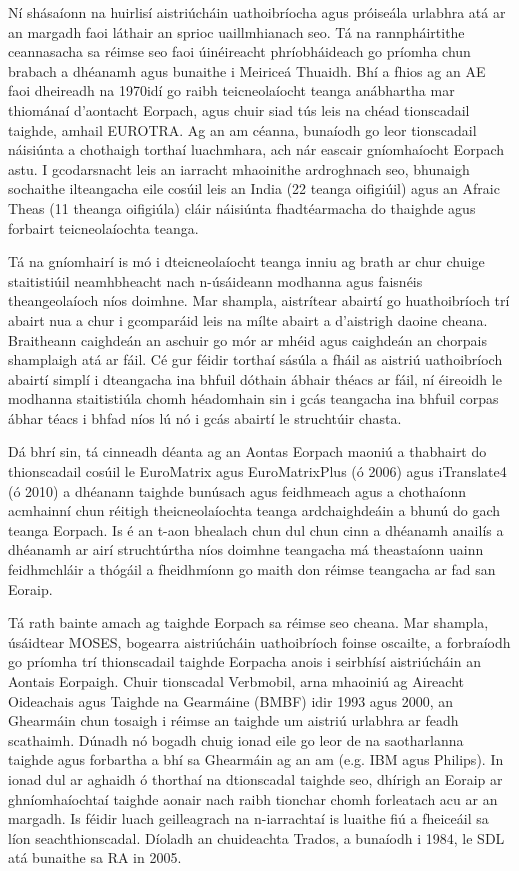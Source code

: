 \begin{multicols}{2}

Ní shásaíonn na huirlisí aistriúcháin uathoibríocha agus próiseála urlabhra atá ar an margadh faoi láthair an sprioc uaillmhianach seo. Tá na rannpháirtithe ceannasacha sa réimse seo faoi úinéireacht phríobháideach go príomha chun brabach a dhéanamh agus bunaithe i Meiriceá Thuaidh. Bhí a fhios ag an AE faoi dheireadh na 1970idí go raibh teicneolaíocht teanga an\-ábhartha mar thiománaí d’aontacht Eorpach, agus chuir siad tús leis na chéad tionscadail taighde, amhail EUROTRA. Ag an am céanna, bunaíodh go leor tionscadail náisiúnta a chothaigh torthaí luachmhara, ach nár eascair gníomhaíocht Eorpach astu. I gcodarsnacht leis an iarracht mhaoinithe ardroghnach seo, bhunaigh sochaithe ilteangacha eile cosúil leis an India (22 teanga oifigiúil) agus an Afraic Theas (11 theanga oifigiúla) cláir náisiúnta fhadtéarmacha do thaighde agus forbairt teicneolaíochta teanga. 

Tá na gníomhairí is mó i dteicneolaíocht teanga inniu ag brath ar chur chuige staitistiúil neamhbheacht nach n-úsáideann modhanna agus faisnéis theangeolaíoch níos doimhne. Mar shampla, aistrítear abairtí go huathoibríoch trí abairt nua a chur i gcomparáid leis na mílte abairt a d’aistrigh daoine cheana. Braitheann caighdeán an aschuir go mór ar mhéid agus caighdeán an chorpais shamplaigh atá ar fáil. Cé gur féidir torthaí sásúla a fháil as aistriú uathoibríoch abairtí simplí i dteangacha ina bhfuil dóthain ábhair théacs ar fáil, ní éireoidh le modhanna staitistiúla chomh héadomhain sin i gcás teangacha ina bhfuil corpas ábhar téacs i bhfad níos lú nó i gcás abairtí le struchtúir chasta.

Dá bhrí sin, tá cinneadh déanta ag an Aontas Eorpach maoniú a thabhairt do thionscadail cosúil le EuroMatrix agus EuroMatrixPlus (ó 2006) agus iTranslate4 (ó 2010) a dhéanann taighde bunúsach agus feidhmeach agus a chothaíonn acmhainní chun réitigh theicneolaíochta teanga ardchaighdeáin a bhunú do gach teanga Eorpach. Is é an t-aon bhealach chun dul chun cinn a dhéanamh anailís a dhéanamh ar airí struchtúrtha níos doimhne teangacha má theastaíonn uainn feidhmchláir a thógáil a fheidhmíonn go maith don réimse teangacha ar fad san Eoraip.

Tá rath bainte amach ag taighde Eorpach sa réimse seo cheana. Mar shampla, úsáidtear MOSES, bogearra aistriúcháin uathoibríoch foinse oscailte, a forbraíodh go príomha trí thionscadail taighde Eorpacha anois i seirbhísí aistriúcháin an Aontais Eorpaigh. Chuir tionscadal Verbmobil, arna mhaoiniú ag Aireacht Oideachais agus Taighde na Gearmáine (BMBF) idir 1993 agus 2000, an Ghearmáin chun tosaigh i réimse an taighde um aistriú urlabhra ar feadh scathaimh. Dúnadh nó bogadh chuig ionad eile go leor de na saotharlanna taighde agus forbartha a bhí sa Ghearmáin ag an am (e.g. IBM agus Philips). In ionad dul ar aghaidh ó thorthaí na dtionscadal taighde seo, dhírigh an Eoraip ar ghníomhaíochtaí taighde aonair nach raibh tionchar chomh forleatach acu ar an margadh.  Is féidir luach geilleagrach na n-iarrachtaí is luaithe fiú a fheiceáil sa líon seachthionscadal. Díoladh an chuideachta Trados, a bunaíodh i 1984, le SDL atá bunaithe sa RA in 2005.



\end{multicols}
